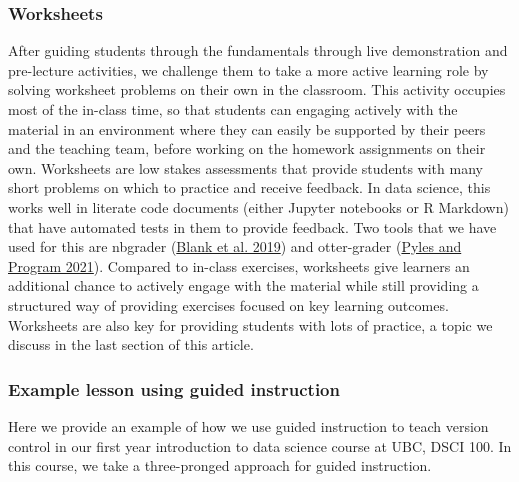 \documentclass{article}
\begin{document}
\hypertarget{worksheets}{%
\subsubsection{Worksheets}\label{worksheets}}

After guiding students through the fundamentals through live
demonstration and pre-lecture activities, we challenge them to take a
more active learning role by solving worksheet problems on their own in
the classroom. This activity occupies most of the in-class time, so that
students can engaging actively with the material in an environment where
they can easily be supported by their peers and the teaching team,
before working on the homework assignments on their own. Worksheets are
low stakes assessments that provide students with many short problems on
which to practice and receive feedback. In data science, this works well
in literate code documents (either Jupyter notebooks or R Markdown) that
have automated tests in them to provide feedback. Two tools that we have
used for this are nbgrader
(\protect\hyperlink{ref-blank2019nbgrader}{Blank et al. 2019}) and
otter-grader (\protect\hyperlink{ref-otter}{Pyles and Program 2021}).
Compared to in-class exercises, worksheets give learners an additional
chance to actively engage with the material while still providing a
structured way of providing exercises focused on key learning outcomes.
Worksheets are also key for providing students with lots of practice, a
topic we discuss in the last section of this article.

\hypertarget{example-lesson-using-guided-instruction}{%
\subsubsection{Example lesson using guided
instruction}\label{example-lesson-using-guided-instruction}}

Here we provide an example of how we use guided instruction to teach
version control in our first year introduction to data science course at
UBC, DSCI 100. In this course, we take a three-pronged approach for
guided instruction.
\end{document}

